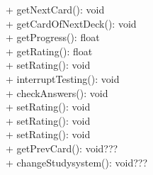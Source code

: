 {
    + getNextCard(): void\\
    + getCardOfNextDeck(): void\\
    + getProgress(): float\\
    + getRating(): float\\
    + setRating(): void\\
    + interruptTesting(): void\\
    + checkAnswers(): void\\
    + setRating(): void\\
    + setRating(): void\\
    + setRating(): void\\
    + getPrevCard(): void???\\
    + changeStudysystem(): void???\\
	
}{}
